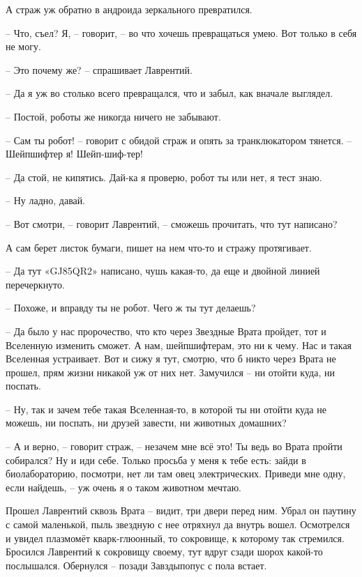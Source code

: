 \documentclass[ebook,oneside,final,openright]{memoir}
\begin{document}
\par
А страж уж обратно в андроида зеркального превратился. \par
– Что, съел? Я, – говорит, – во что хочешь превращаться умею. Вот только в себя не могу. \par
– Это почему же? – спрашивает Лаврентий.\par
– Да я уж во столько всего превращался, что и забыл, как вначале выглядел. \par
– Постой, роботы же никогда ничего не забывают. \par
– Сам ты робот! – говорит с обидой страж и опять за транклюкатором тянется. – Шейпшифтер я! Шейп-шиф-тер! \par
– Да стой, не кипятись. Дай-ка я проверю, робот ты или нет, я тест знаю. \par
– Ну ладно, давай. \par
– Вот смотри, – говорит Лаврентий, – сможешь прочитать, что тут написано? \par
А сам берет листок бумаги, пишет на нем что-то и стражу протягивает. \par
– Да тут «GJ85QR2» написано, чушь какая-то, да еще и двойной линией перечеркнуто.\par
– Похоже, и вправду ты не робот. Чего ж ты тут делаешь? \par
– Да было у нас пророчество, что кто через Звездные Врата пройдет, тот и Вселенную изменить сможет. А нам, шейпшифтерам, это ни к чему. Нас и такая Вселенная устраивает. Вот и сижу я тут, смотрю, что б никто через Врата не прошел, прям жизни никакой уж от них нет. Замучился – ни отойти куда, ни поспать. \par
– Ну, так и зачем тебе такая Вселенная-то, в которой ты ни отойти куда не можешь, ни поспать, ни друзей завести, ни животных домашних? \par
– А и верно, – говорит страж, – незачем мне всё это! Ты ведь во Врата пройти собирался? Ну и иди себе. Только просьба у меня к тебе есть: зайди в биолабораторию, посмотри, нет ли там овец электрических. Приведи мне одну, если найдешь, – уж очень я о таком животном мечтаю.\par
\par
\par
Прошел Лаврентий сквозь Врата – видит, три двери перед ним. Убрал он паутину с самой маленькой, пыль звездную с нее отряхнул да внутрь вошел. Осмотрелся и увидел плазмомёт кварк-глюонный, то сокровище, к которому так стремился. Бросился Лаврентий к сокровищу своему, тут вдруг сзади шорох какой-то послышался. Обернулся – позади Завздыпопус с пола встает.\par
\end{document}
